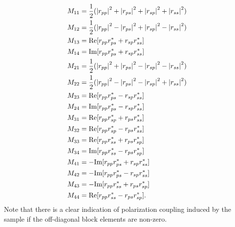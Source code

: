 \begin{subequations}
\begin{align}
    M_{11} &= \frac{1}{2}(\left| r_{pp} \right|^2 + \left| r_{ps} \right|^2 + \left| r_{sp} \right|^2 + \left| r_{ss} \right|^2)    \\
    M_{12} &= \frac{1}{2}(\left| r_{pp} \right|^2 - \left| r_{ps} \right|^2 + \left| r_{sp} \right|^2 - \left| r_{ss} \right|^2)     \\
    M_{13} &= \text{Re}[r_{pp}r_{ps}^* + r_{sp}r_{ss}^*]    \\
    M_{14} &= \text{Im}[r_{pp}r_{ps}^* + r_{sp}r_{ss}^*]    \\
    M_{21} &= \frac{1}{2}(\left| r_{pp} \right|^2 + \left| r_{ps} \right|^2 - \left| r_{sp} \right|^2 - \left| r_{ss} \right|^2)     \\
    M_{22} &= \frac{1}{2}(\left| r_{pp} \right|^2 - \left| r_{ps} \right|^2 - \left| r_{sp} \right|^2 + \left| r_{ss} \right|^2)     \\
    M_{23} &= \text{Re}[r_{pp}r_{ps}^* - r_{sp}r_{ss}^*]    \\
    M_{24} &= \text{Im}[r_{pp}r_{ps}^* - r_{sp}r_{ss}^*]    \\
    M_{31} &= \text{Re}[r_{pp}r_{sp}^* + r_{ps}r_{ss}^*]    \\
    M_{32} &= \text{Re}[r_{pp}r_{sp}^* - r_{ps}r_{ss}^*]    \\
    M_{33} &= \text{Re}[r_{pp}r_{ss}^* + r_{ps}r_{sp}^*]    \\
    M_{34} &= \text{Im}[r_{pp}r_{ss}^* - r_{ps}r_{sp}^*]    \\
    M_{41} &= -\text{Im}[r_{pp}r_{ps}^* + r_{sp}r_{ss}^*]    \\
    M_{42} &= -\text{Im}[r_{pp}r_{ps}^* - r_{sp}r_{ss}^*]    \\
    M_{43} &= -\text{Im}[r_{pp}r_{ss}^* + r_{ps}r_{sp}^*]    \\
    M_{44} &= \text{Re}[r_{pp}r_{ss}^* - r_{ps}r_{sp}^*].    \\
\end{align}
    \label{eq:JonesToMueller}
\end{subequations}
Note that there is a clear indication of polarization coupling induced by the sample if the off-diagonal block elements are non-zero.

